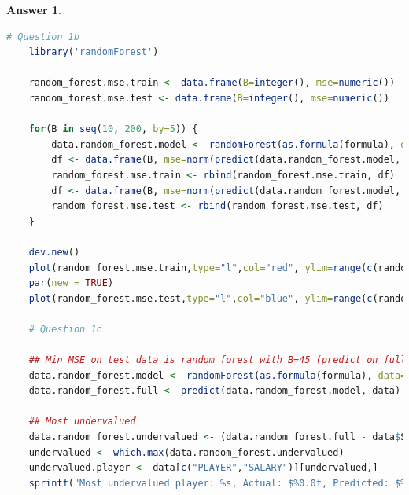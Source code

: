 \documentclass[12pt]{article}
\theoremstyle{colon}
\newtheorem*{answer}{Answer}
\begin{document}
\begin{answer}
\begin{lstlisting}[language=R, basicstyle=\scriptsize, breaklines=true]
    # Question 1b
    library('randomForest')

    random_forest.mse.train <- data.frame(B=integer(), mse=numeric())
    random_forest.mse.test <- data.frame(B=integer(), mse=numeric())

    for(B in seq(10, 200, by=5)) {
        data.random_forest.model <- randomForest(as.formula(formula), data=data.train, ntree=B)
        df <- data.frame(B, mse=norm(predict(data.random_forest.model, data.train) - data.train$SALARY, type="2"))
        random_forest.mse.train <- rbind(random_forest.mse.train, df)
        df <- data.frame(B, mse=norm(predict(data.random_forest.model, data.test) - data.test$SALARY, type="2"))
        random_forest.mse.test <- rbind(random_forest.mse.test, df)
    }

    dev.new()
    plot(random_forest.mse.train,type="l",col="red", ylim=range(c(random_forest.mse.train["mse"],random_forest.mse.test["mse"])))
    par(new = TRUE)
    plot(random_forest.mse.test,type="l",col="blue", ylim=range(c(random_forest.mse.train["mse"],random_forest.mse.test["mse"])))

    # Question 1c

    ## Min MSE on test data is random forest with B=45 (predict on full data set)
    data.random_forest.model <- randomForest(as.formula(formula), data=data.train, ntree=45)
    data.random_forest.full <- predict(data.random_forest.model, data)

    ## Most undervalued
    data.random_forest.undervalued <- (data.random_forest.full - data$SALARY)
    undervalued <- which.max(data.random_forest.undervalued)
    undervalued.player <- data[c("PLAYER","SALARY")][undervalued,]
    sprintf("Most undervalued player: %s, Actual: $%0.0f, Predicted: $%0.0f", undervalued.player$PLAYER, undervalued.player$SALARY, data.random_forest.undervalued[undervalued])
  \end{lstlisting}
\end{answer}

\clearpage
\end{document}
